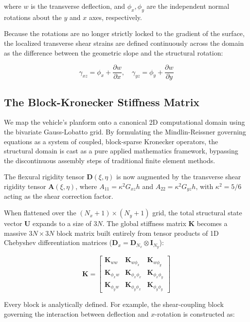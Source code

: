 \documentclass[11pt,a4paper]{article}
\theoremstyle{definition}
\numberwithin{equation}{section}
\begin{document}
where $w$ is the transverse deflection, and $\phi_x, \phi_y$ are the independent normal rotations about the $y$ and $x$ axes, respectively.

Because the rotations are no longer strictly locked to the gradient of the surface, the localized transverse shear strains are defined continuously across the domain as the difference between the geometric slope and the structural rotation:

$$\gamma_{xz} = \phi_x + \frac{\partial w}{\partial x}, \quad \gamma_{yz} = \phi_y + \frac{\partial w}{\partial y}$$

\subsection{The Block-Kronecker Stiffness Matrix}
We map the vehicle's planform onto a canonical 2D computational domain using the bivariate Gauss-Lobatto grid. By formulating the Mindlin-Reissner governing equations as a system of coupled, block-sparse Kronecker operators, the structural domain is cast as a pure applied mathematics framework, bypassing the discontinuous assembly steps of traditional finite element methods.

The flexural rigidity tensor $\mathbf{D}(\xi, \eta)$ is now augmented by the transverse shear rigidity tensor $\mathbf{A}(\xi, \eta)$, where $A_{11} = \kappa^2 G_{xz} h$ and $A_{22} = \kappa^2 G_{yz} h$, with $\kappa^2 = 5/6$ acting as the shear correction factor.

When flattened over the $(N_x+1) \times (N_y+1)$ grid, the total structural state vector $\mathbf{U}$ expands to a size of $3N$. The global stiffness matrix $\mathbf{K}$ becomes a massive $3N \times 3N$ block matrix built entirely from tensor products of 1D Chebyshev differentiation matrices ($\mathbf{D}_x = \mathbf{D}_{N_x} \otimes \mathbf{I}_{N_y}$):

$$\mathbf{K} = \begin{bmatrix} \mathbf{K}_{ww} & \mathbf{K}_{w\phi_x} & \mathbf{K}_{w\phi_y} \\ \mathbf{K}_{\phi_x w} & \mathbf{K}_{\phi_x \phi_x} & \mathbf{K}_{\phi_x \phi_y} \\ \mathbf{K}_{\phi_y w} & \mathbf{K}_{\phi_y \phi_x} & \mathbf{K}_{\phi_y \phi_y} \end{bmatrix}$$

Every block is analytically defined. For example, the shear-coupling block governing the interaction between deflection and $x$-rotation is constructed as:
\end{document}
